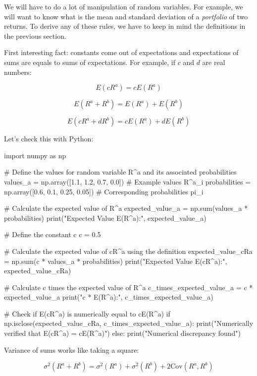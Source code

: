 We will have to do a lot of manipulation of random variables. 
For example, we will want to know what is the mean 
and standard deviation of a \textit{portfolio} of 
two returns. To derive any of these rules, we have to keep in mind
 the definitions in the previous section.

First interesting fact: constants come out of 
expectations and expectations of sums are equals 
to sums of expectations. For example, if $c$ and $d$
are real numbers:

\begin{equation}
    E(cR^a) = cE(R^a)
\end{equation}

\begin{equation}
    E(R^a + R^b) = E(R^a) + E(R^b)
\end{equation}

\begin{equation}
    E(cR^a + dR^b) = cE(R^a) + dE(R^b)
\end{equation}

Let's check this with Python:

\begin{python}
import numpy as np

# Define the values for random variable R^a and its associated probabilities
values_a = np.array([1.1, 1.2, 0.7, 0.0])  # Example values R^a_i
probabilities = np.array([0.6, 0.1, 0.25, 0.05])  # Corresponding probabilities pi_i

# Calculate the expected value of R^a
expected_value_a = np.sum(values_a * probabilities)
print("Expected Value E(R^a):", expected_value_a)

# Define the constant c
c = 0.5

# Calculate the expected value of cR^a using the definition
expected_value_cRa = np.sum(c * values_a * probabilities)
print("Expected Value E(cR^a):", expected_value_cRa)

# Calculate c times the expected value of R^a
c_times_expected_value_a = c * expected_value_a
print("c * E(R^a):", c_times_expected_value_a)

# Check if E(cR^a) is numerically equal to cE(R^a)
if np.isclose(expected_value_cRa, c_times_expected_value_a):
    print("Numerically verified that E(cR^a) = cE(R^a)")
else:
    print("Numerical discrepancy found")
\end{python}

Variance of sums works like taking a square:

\begin{equation}
    \sigma^2(R^a + R^b) = \sigma^2(R^a) + \sigma^2(R^b) + 2\text{Cov}(R^a, R^b)
\end{equation}

